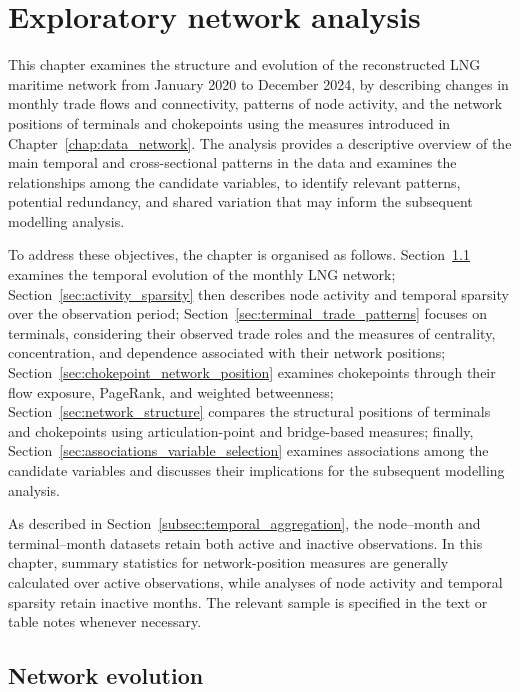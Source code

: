 \documentclass[pdftex,12pt,openright,a4paper,oneside]{book}
\begin{document}
\chapter{Exploratory network analysis}
\label{chap:exploratory_analysis}

This chapter examines the structure and evolution of the reconstructed LNG maritime network from January 2020 to December 2024, by describing changes in monthly trade flows and connectivity, patterns of node activity, and the network positions of terminals and chokepoints using the measures introduced in Chapter~\ref{chap:data_network}. 
The analysis provides a descriptive overview of the main temporal and cross-sectional patterns in the data and examines the relationships among the candidate variables, to identify relevant patterns, potential redundancy, and shared variation that may inform the subsequent modelling analysis.

To address these objectives, the chapter is organised as follows. Section~\ref{sec:network_evolution} examines the temporal evolution of the monthly LNG network; Section~\ref{sec:activity_sparsity} then describes node activity and temporal sparsity over the observation period;
Section~\ref{sec:terminal_trade_patterns} focuses on terminals, considering their observed trade roles and the measures of centrality, concentration, and dependence associated with their network positions;
Section~\ref{sec:chokepoint_network_position} examines chokepoints through their flow exposure, PageRank, and weighted betweenness;
Section~\ref{sec:network_structure} compares the structural positions of terminals and chokepoints using articulation-point and bridge-based measures;
finally, Section~\ref{sec:associations_variable_selection} examines associations among the candidate variables and discusses their implications for the subsequent modelling analysis.

As described in Section~\ref{subsec:temporal_aggregation}, the node--month and terminal--month datasets retain both active and inactive observations. 
In this chapter, summary statistics for network-position measures are generally calculated over active observations, while analyses of node activity and temporal sparsity retain inactive months. 
The relevant sample is specified in the text or table notes whenever necessary.

\section{Network evolution}
\label{sec:network_evolution}
\end{document}
